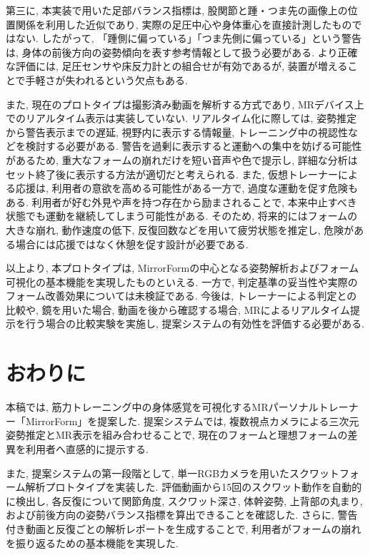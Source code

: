 \documentclass[a4paper,9pt,twocolumn]{jsarticle}
\begin{document}
第三に, 本実装で用いた足部バランス指標は, 股関節と踵・つま先の画像上の位置関係を利用した近似であり, 実際の足圧中心や身体重心を直接計測したものではない. 
したがって, 「踵側に偏っている」「つま先側に偏っている」という警告は, 身体の前後方向の姿勢傾向を表す参考情報として扱う必要がある. 
より正確な評価には, 足圧センサや床反力計との組合せが有効であるが, 装置が増えることで手軽さが失われるという欠点もある. 

また, 現在のプロトタイプは撮影済み動画を解析する方式であり, MRデバイス上でのリアルタイム表示は実装していない. 
リアルタイム化に際しては, 姿勢推定から警告表示までの遅延, 視野内に表示する情報量, トレーニング中の視認性などを検討する必要がある. 
警告を過剰に表示すると運動への集中を妨げる可能性があるため, 重大なフォームの崩れだけを短い音声や色で提示し, 詳細な分析はセット終了後に表示する方法が適切だと考えられる. 
また, 仮想トレーナーによる応援は, 利用者の意欲を高める可能性がある一方で, 過度な運動を促す危険もある. 
利用者が好む外見や声を持つ存在から励まされることで, 本来中止すべき状態でも運動を継続してしまう可能性がある. 
そのため, 将来的にはフォームの大きな崩れ, 動作速度の低下, 反復回数などを用いて疲労状態を推定し, 危険がある場合には応援ではなく休憩を促す設計が必要である. 

以上より, 本プロトタイプは, MirrorFormの中心となる姿勢解析およびフォーム可視化の基本機能を実現したものといえる. 
一方で, 判定基準の妥当性や実際のフォーム改善効果については未検証である. 
今後は, トレーナーによる判定との比較や, 鏡を用いた場合, 動画を後から確認する場合, MRによるリアルタイム提示を行う場合の比較実験を実施し, 提案システムの有効性を評価する必要がある. 

\section{おわりに}

本稿では, 筋力トレーニング中の身体感覚を可視化するMRパーソナルトレーナー「MirrorForm」を提案した. 
提案システムでは, 複数視点カメラによる三次元姿勢推定とMR表示を組み合わせることで, 現在のフォームと理想フォームの差異を利用者へ直感的に提示する. 

また, 提案システムの第一段階として, 単一RGBカメラを用いたスクワットフォーム解析プロトタイプを実装した. 
評価動画から15回のスクワット動作を自動的に検出し, 各反復について関節角度, スクワット深さ, 体幹姿勢, 上背部の丸まり, および前後方向の姿勢バランス指標を算出できることを確認した. 
さらに, 警告付き動画と反復ごとの解析レポートを生成することで, 利用者がフォームの崩れを振り返るための基本機能を実現した. 
\end{document}
